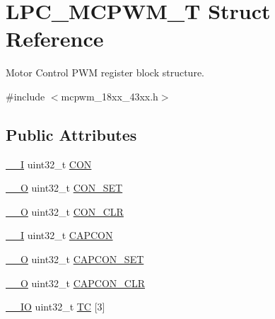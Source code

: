 \hypertarget{struct_l_p_c___m_c_p_w_m___t}{}\section{L\+P\+C\+\_\+\+M\+C\+P\+W\+M\+\_\+T Struct Reference}
\label{struct_l_p_c___m_c_p_w_m___t}


Motor Control P\+WM register block structure.  




{\ttfamily \#include $<$mcpwm\+\_\+18xx\+\_\+43xx.\+h$>$}

\subsection*{Public Attributes}
\begin{DoxyCompactItemize}
\item 
\hyperlink{core__sc300_8h_af63697ed9952cc71e1225efe205f6cd3}{\+\_\+\+\_\+I} uint32\+\_\+t \hyperlink{struct_l_p_c___m_c_p_w_m___t_ae047b5f0f2ca06bbaa663ce2458ae7ad}{C\+ON}
\item 
\hyperlink{core__sc300_8h_a7e25d9380f9ef903923964322e71f2f6}{\+\_\+\+\_\+O} uint32\+\_\+t \hyperlink{struct_l_p_c___m_c_p_w_m___t_a3dc36e144bb33d1756f06c765726f15d}{C\+O\+N\+\_\+\+S\+ET}
\item 
\hyperlink{core__sc300_8h_a7e25d9380f9ef903923964322e71f2f6}{\+\_\+\+\_\+O} uint32\+\_\+t \hyperlink{struct_l_p_c___m_c_p_w_m___t_a22b564b847caa28e9f0c53ff38375cc3}{C\+O\+N\+\_\+\+C\+LR}
\item 
\hyperlink{core__sc300_8h_af63697ed9952cc71e1225efe205f6cd3}{\+\_\+\+\_\+I} uint32\+\_\+t \hyperlink{struct_l_p_c___m_c_p_w_m___t_a47afe6c393cc7da61af1d48bfc0f709c}{C\+A\+P\+C\+ON}
\item 
\hyperlink{core__sc300_8h_a7e25d9380f9ef903923964322e71f2f6}{\+\_\+\+\_\+O} uint32\+\_\+t \hyperlink{struct_l_p_c___m_c_p_w_m___t_a8511a69d57549e1765080274f4bd5c3c}{C\+A\+P\+C\+O\+N\+\_\+\+S\+ET}
\item 
\hyperlink{core__sc300_8h_a7e25d9380f9ef903923964322e71f2f6}{\+\_\+\+\_\+O} uint32\+\_\+t \hyperlink{struct_l_p_c___m_c_p_w_m___t_aadd69d706d636d53ff8893d3a0be210a}{C\+A\+P\+C\+O\+N\+\_\+\+C\+LR}
\item 
\hyperlink{core__sc300_8h_aec43007d9998a0a0e01faede4133d6be}{\+\_\+\+\_\+\+IO} uint32\+\_\+t \hyperlink{struct_l_p_c___m_c_p_w_m___t_ae6960477ec37aa32fbb20956cf01edb7}{TC} \mbox{[}3\mbox{]}
\item 

\end{DoxyCompactItemize}
